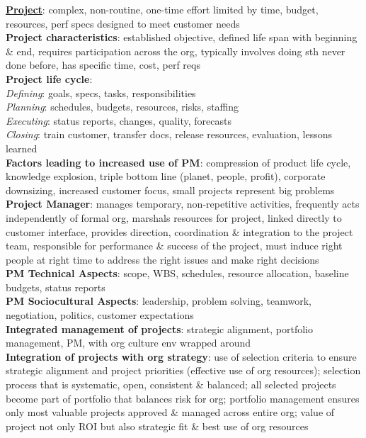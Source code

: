 \documentclass[a4paper]{article}
\begin{document}
    \begin{multicols}{2}
        \tiny
        \noindent\underline{\textbf{Project}}: complex, non-routine, one-time effort limited by time, budget, resources, perf specs designed to meet customer needs\\
        \textbf{Project characteristics}: established objective, defined life span with beginning \& end, requires participation across the org, typically involves doing sth never done before, has specific time, cost, perf reqs\\
        \textbf{Project life cycle}:\\
        \textit{Defining}: goals, specs, tasks, responsibilities\\
        \textit{Planning}: schedules, budgets, resources, risks, staffing\\
        \textit{Executing}: status reports, changes, quality, forecasts\\
        \textit{Closing}: train customer, transfer docs, release resources, evaluation, lessons learned\\
        \textbf{Factors leading to increased use of PM}: compression of product life cycle, knowledge explosion, triple bottom line (planet, people, profit), corporate downsizing, increased customer focus, small projects represent big problems\\
        \textbf{Project Manager}: manages temporary, non-repetitive activities, frequently acts independently of formal org, marshals resources for project, linked directly to customer interface, provides direction, coordination \& integration to the project team, responsible for performance \& success of the project, must induce right people at right time to address the right issues and make right decisions\\
        \textbf{PM Technical Aspects}: scope, WBS, schedules, resource allocation, baseline budgets, status reports\\
        \textbf{PM Sociocultural Aspects}: leadership, problem solving, teamwork, negotiation, politics, customer expectations\\
        \textbf{Integrated management of projects}: strategic alignment, portfolio management, PM, with org culture env wrapped around\\
        \textbf{Integration of projects with org strategy}: use of selection criteria to ensure strategic alignment and project priorities (effective use of org resources); selection process that is systematic, open, consistent \& balanced; all selected projects become part of portfolio that balances risk for org; portfolio management ensures only most valuable projects approved \& managed across entire org; value of project not only ROI but also strategic fit \& best use of org resources\\

\end{multicols}
\end{document}
